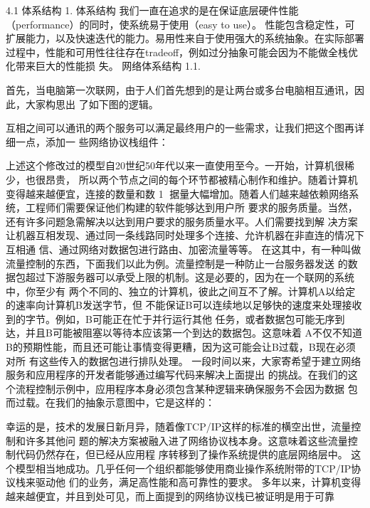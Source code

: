 
4.1 体系结构
1.   体系结构
我们一直在追求的是在保证底层硬件性能（performance）的同时，使系统易于使用（easy to use）。
性能包含稳定性，可扩展能力，以及快速迭代的能力。易用性来自于使用强大的系统抽象。在实际部署
过程中，性能和可用性往往存在tradeoff，例如过分抽象可能会因为不能做全栈优化带来巨大的性能损
失。
  网络体系结构
1.1.

首先，当电脑第一次联网，由于人们首先想到的是让两台或多台电脑相互通讯，因此，大家构思出
了如下图的逻辑。




互相之间可以通讯的两个服务可以满足最终用户的一些需求，让我们把这个图再详细一点，添加一
些网络协议栈组件：




上述这个修改过的模型自20世纪50年代以来一直使用至今。一开始，计算机很稀少，也很昂贵，
所以两个节点之间的每个环节都被精心制作和维护。随着计算机变得越来越便宜，连接的数量和数
                                                       1
据量大幅增加。随着人们越来越依赖网络系统，工程师们需要保证他们构建的软件能够达到用户所
要求的服务质量。当然，还有许多问题急需解决以达到用户要求的服务质量水平。人们需要找到解
决方案让机器互相发现、通过同一条线路同时处理多个连接、允许机器在非直连的情况下互相通
信、通过网络对数据包进行路由、加密流量等等。
在这其中，有一种叫做流量控制的东西，下面我们以此为例。流量控制是一种防止一台服务器发送
的数据包超过下游服务器可以承受上限的机制。这是必要的，因为在一个联网的系统中，你至少有
两个不同的、独立的计算机，彼此之间互不了解。计算机A以给定的速率向计算机B发送字节，但
不能保证B可以连续地以足够快的速度来处理接收到的字节。例如，B可能正在忙于并行运行其他
任务，或者数据包可能无序到达，并且B可能被阻塞以等待本应该第一个到达的数据包。这意味着
A不仅不知道B的预期性能，而且还可能让事情变得更糟，因为这可能会让B过载，B现在必须对所
有这些传入的数据包进行排队处理。
一段时间以来，大家寄希望于建立网络服务和应用程序的开发者能够通过编写代码来解决上面提出
的挑战。在我们的这个流程控制示例中，应用程序本身必须包含某种逻辑来确保服务不会因为数据
包而过载。在我们的抽象示意图中，它是这样的：




幸运的是，技术的发展日新月异，随着像TCP/IP这样的标准的横空出世，流量控制和许多其他问
题的解决方案被融入进了网络协议栈本身。这意味着这些流量控制代码仍然存在，但已经从应用程
序转移到了操作系统提供的底层网络层中。
这个模型相当地成功。几乎任何一个组织都能够使用商业操作系统附带的TCP/IP协议栈来驱动他
们的业务，满足高性能和高可靠性的要求。
多年以来，计算机变得越来越便宜，并且到处可见，而上面提到的网络协议栈已被证明是用于可靠

